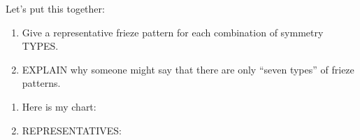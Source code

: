 \documentclass[noauthor,nooutcomes,hints,handout]{../ximera}
\begin{document}
\begin{question}
  Let's put this together:
  \begin{enumerate}
  \item Give a representative frieze pattern for each combination of symmetry TYPES.
  \item EXPLAIN why someone might say that there are only ``seven
    types'' of frieze patterns.
  \end{enumerate}
  \begin{freeResponse}
    \begin{enumerate}
    \item Here is my chart:
      \begin{center}
      \end{center}
    \item REPRESENTATIVES:
      \begin{description}

\end{description}
\end{enumerate}
\end{freeResponse}
\end{question}
\end{document}
